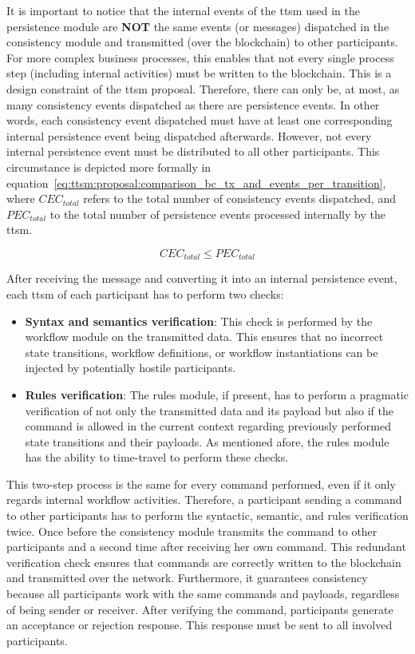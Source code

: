 It is important to notice that the internal events of the \gls{ttsm} used in the persistence module are \textbf{NOT} the same events (or messages) dispatched in the consistency module and transmitted (over the blockchain) to other participants. For more complex business processes, this enables that not every single process step (including internal activities) must be written to the blockchain. This is a design constraint of the \gls{ttsm} proposal. Therefore, there can only be, at most, as many consistency events dispatched as there are persistence events. In other words, each consistency event dispatched must have at least one corresponding internal persistence event being dispatched afterwards. However, not every internal persistence event must be distributed to all other participants. This circumstance is depicted more formally in equation~\ref{eq:ttsm:proposal:comparison_bc_tx_and_events_per_transition}, where $CEC_{total}$ refers to the total number of consistency events dispatched, and $PEC_{total}$ to the total number of persistence events processed internally by the \gls{ttsm}.

\begin{equation}
\label{eq:ttsm:proposal:comparison_bc_tx_and_events_per_transition}
CEC_{total} \leq PEC_{total}
\end{equation}

After receiving the message and converting it into an internal persistence event, each \gls{ttsm} of each participant has to perform two checks:

\begin{itemize}
    \item \textbf{Syntax and semantics verification}: This check is performed by the workflow module on the transmitted data. This ensures that no incorrect state transitions, workflow definitions, or workflow instantiations can be injected by potentially hostile participants.
    \item \textbf{Rules verification}: The rules module, if present, has to perform a pragmatic verification of not only the transmitted data and its payload but also if the command is allowed in the current context regarding previously performed state transitions and their payloads. As mentioned afore, the rules module has the ability to time-travel to perform these checks.
\end{itemize}

This two-step process is the same for every command performed, even if it only regards internal workflow activities. Therefore, a participant sending a command to other participants has to perform the syntactic, semantic, and rules verification twice. Once before the consistency module transmits the command to other participants and a second time after receiving her own command. This redundant verification check ensures that commands are correctly written to the blockchain and transmitted over the network. Furthermore, it guarantees consistency because all participants work with the same commands and payloads, regardless of being sender or receiver. After verifying the command, participants generate an acceptance or rejection response. This response must be sent to all involved participants.

